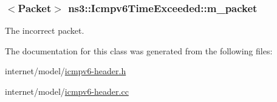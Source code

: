 \subsubsection[{\texorpdfstring{m\+\_\+packet}{m_packet}}]{$<${\bf Packet}$>$ ns3\+::\+Icmpv6\+Time\+Exceeded\+::m\+\_\+packet\hspace{0.3cm}{\ttfamily [private]}}\hypertarget{classns3_1_1Icmpv6TimeExceeded_ab1bd4e5772991b7733caee24768e0e21}{}\label{classns3_1_1Icmpv6TimeExceeded_ab1bd4e5772991b7733caee24768e0e21}


The incorrect packet. 



The documentation for this class was generated from the following files\+:\begin{DoxyCompactItemize}
\item 
internet/model/\hyperlink{icmpv6-header_8h}{icmpv6-\/header.\+h}\item 
internet/model/\hyperlink{icmpv6-header_8cc}{icmpv6-\/header.\+cc}\end{DoxyCompactItemize}
